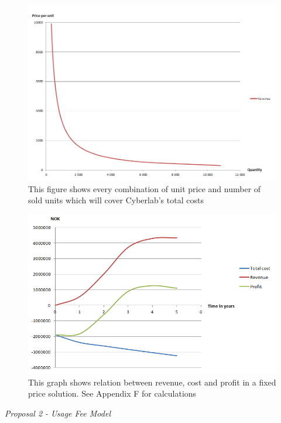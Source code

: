\begin{figure}
\includegraphics[scale=0.6]{relationpriceandunits}
\caption[Relation between price per unit and number of sold units]{This figure shows every combination of unit price and number of sold units which will cover Cyberlab's total costs}
\label{fig:RelationPriceAndUnits}
\end{figure}
\begin{figure}
\begin{center}
\includegraphics[scale=0.8]{profitfixed}
\caption[Profit, revenue and cost for a fixed price solution]{This graph shows relation between revenue, cost and profit in a fixed price solution. See Appendix F for calculations}
\label{fig:ProfitFixed}
\end{center}
\end{figure}
\newpage
\emph{Proposal 2 - Usage Fee Model}\\ \\
